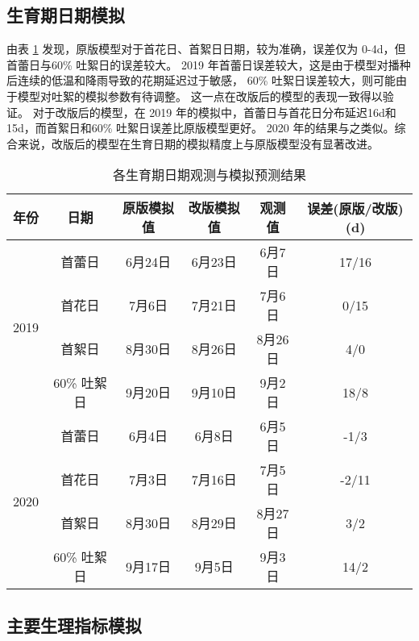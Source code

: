 \subsection{生育期日期模拟}
由表 \ref{tab:lifecycle} 发现，原版模型对于首花日、首絮日日期，较为准确，误差仅为 0-4d，但首蕾日与60\% 吐絮日的误差较大。%
2019 年首蕾日误差较大，这是由于模型对播种后连续的低温和降雨导致的花期延迟过于敏感，%
60\% 吐絮日误差较大，则可能由于模型对吐絮的模拟参数有待调整。%
这一点在改版后的模型的表现一致得以验证。
对于改版后的模型，在 2019 年的模拟中，首蕾日与首花日分布延迟16d和15d，而首絮日和60\% 吐絮日误差比原版模型更好。%
2020 年的结果与之类似。综合来说，改版后的模型在生育日期的模拟精度上与原版模型没有显著改进。

\begin{table}
    \caption{各生育期日期观测与模拟预测结果}\label{tab:lifecycle}
    \begin{tabular}{cccccc}
        \toprule
        年份                  & 日期        & 原版模拟值 & 改版模拟值 & 观测值  & 误差(原版/改版) (d) \\
        \midrule
        \multirow{4}{*}{2019} & 首蕾日      & 6月24日    & 6月23日    & 6月7日  & 17/16               \\
                              & 首花日      & 7月6日     & 7月21日    & 7月6日  & 0/15                \\
                              & 首絮日      & 8月30日    & 8月26日    & 8月26日 & 4/0                 \\
                              & 60\% 吐絮日 & 9月20日    & 9月10日    & 9月2日  & 18/8                \\
        \hline
        \multirow{4}{*}{2020} & 首蕾日      & 6月4日     & 6月8日     & 6月5日  & -1/3                \\
                              & 首花日      & 7月3日     & 7月16日    & 7月5日  & -2/11               \\
                              & 首絮日      & 8月30日    & 8月29日    & 8月27日 & 3/2                 \\
                              & 60\% 吐絮日 & 9月17日    & 9月5日     & 9月3日  & 14/2                \\
        \bottomrule
    \end{tabular}
\end{table}

\subsection{主要生理指标模拟}

